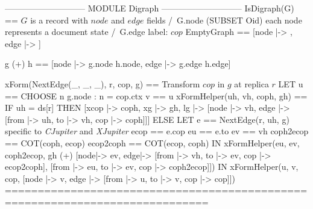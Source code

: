 \documentclass[preview, border={5pt 0pt 46pt 1pt}]{standalone}
\newcommand{\cjupiter}{\textsl{CJupiter}}
\newcommand{\xjupiter}{\textsl{XJupiter}}
\begin{document}
\begin{tla}
----------------------------- MODULE Digraph -----------------------------
IsDigraph(G) == \* $G$ is a record with $node$ and $edge$ fields
    /\ G.node \subseteq (SUBSET Oid) \* each node represents a document state
    /\ G.edge  \* label: $cop$
EmptyGraph == [node |-> {{}}, edge |-> {}]

g (+) h == [node |-> g.node \cup h.node, edge |-> g.edge \cup h.edge]

xForm(NextEdge(_, _, _), r, cop, g) == \* Transform $cop$ in $g$ at replica $r$
    LET u == CHOOSE n \in g.node : n = cop.ctx    v == u 
        xFormHelper(uh, vh, coph, gh) ==
            IF uh = ds[r] THEN [xcop |-> coph, xg |-> gh,
                 lg |-> [node |-> {vh}, edge |-> {[from |-> uh, to |-> vh, cop |-> coph]}]] 
            ELSE LET e == NextEdge(r, uh, g) \* specific to \cjupiter{} and \xjupiter{}
                  ecop == e.cop    eu == e.to    ev == vh 
             coph2ecop == COT(coph, ecop)    ecop2coph == COT(ecop, coph)
                 IN  xFormHelper(eu, ev, coph2ecop,
                       gh (+) [node|-> {ev},
                               edge|-> {[from |-> vh, to |-> ev, cop |-> ecop2coph],
                                        [from |-> eu, to |-> ev, cop |-> coph2ecop]}])
    IN xFormHelper(u, v, cop, [node |-> {v}, edge |-> {[from |-> u, to |-> v, cop |-> cop]}])  
=============================================================================
\end{tla}
\end{document}
